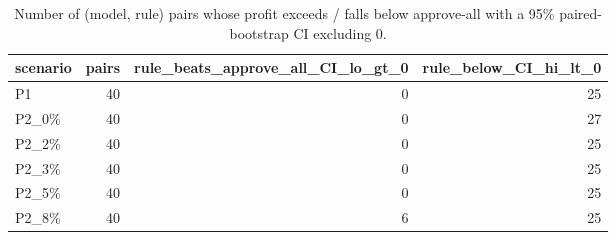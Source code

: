\begin{table}[t]
\centering
\caption{Number of (model, rule) pairs whose profit exceeds / falls below approve-all with a 95\% paired-bootstrap CI excluding 0.}
\label{tab:T7b_h5}
\small
\begin{tabular}{lrrr}
\toprule
scenario & pairs & rule\_beats\_approve\_all\_CI\_lo\_gt\_0 & rule\_below\_CI\_hi\_lt\_0 \\
\midrule
P1 & 40 & 0 & 25 \\
P2\_0\% & 40 & 0 & 27 \\
P2\_2\% & 40 & 0 & 25 \\
P2\_3\% & 40 & 0 & 25 \\
P2\_5\% & 40 & 0 & 25 \\
P2\_8\% & 40 & 6 & 25 \\
\bottomrule
\end{tabular}
\end{table}
